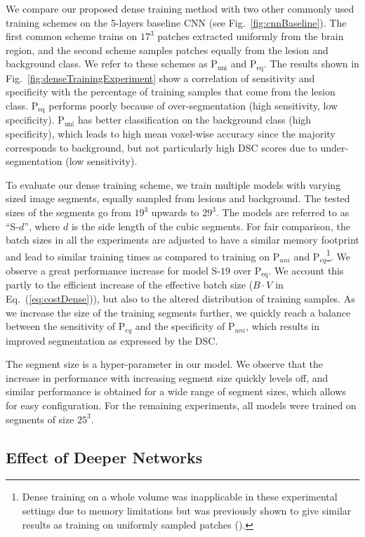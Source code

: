 \documentclass[preprint,authoryear,12pt]{elsarticle}
\newcommand{\quot}[1]{``#1''}
\begin{document}
We compare our proposed dense training method with two other commonly used training schemes on the 5-layers baseline CNN (see Fig.~\ref{fig:cnnBaseline}). The first common scheme trains on $17^3$ patches extracted uniformly from the brain region, and the second scheme samples patches equally from the lesion and background class. We refer to these schemes as P$_\text{uni}$ and P$_\text{eq}$. The results shown in Fig.~\ref{fig:denseTrainingExperiment} show a correlation of sensitivity and specificity with the percentage of training samples that come from the lesion class. P$_\text{eq}$ performs poorly because of over-segmentation (high sensitivity, low specificity). P$_\text{uni}$ has better classification on the background class (high specificity), which leads to high mean voxel-wise accuracy since the majority corresponds to background, but not particularly high DSC scores due to under-segmentation (low sensitivity).

To evaluate our dense training scheme, we train multiple models with varying sized image segments, equally sampled from lesions and background. The tested sizes of the segments go from $19^3$ upwards to $29^3$. The models are referred to as \quot{S-$d$}, where $d$ is the side length of the cubic segments. For fair comparison, the batch sizes in all the experiments are adjusted to have a similar memory footprint and lead to similar training times as compared to training on P$_{uni}$ and P$_{eq}$\footnote{Dense training on a whole volume was inapplicable in these experimental settings due to memory limitations but was previously shown to give similar results as training on uniformly sampled patches (\cite{Long2014}).}. We observe a great performance increase for model S-${19}$ over P$_\text{eq}$. We account this partly to the efficient increase of the effective batch size ($B \cdot V$ in Eq.~(\ref{eq:costDense})), but also to the altered distribution of training samples. As we increase the size of the training segments further, we quickly reach a balance between the sensitivity of P$_{eq}$ and the specificity of P$_{uni}$, which results in improved segmentation as expressed by the DSC.

The segment size is a hyper-parameter in our model. We observe that the increase in performance with increasing segment size quickly levels off, and similar performance is obtained for a wide range of segment sizes, which allows for easy configuration. For the remaining experiments, all models were trained on segments of size $25^3$.


\subsection{Effect of Deeper Networks}
\label{subsec:valDeeper}
\end{document}
